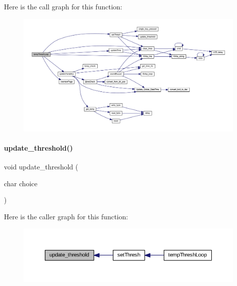 Here is the call graph for this function\+:
\nopagebreak
\begin{figure}[H]
\begin{center}
\leavevmode
\includegraphics[width=350pt]{a00053_af9c48a1dcf99ec4adcf775f6c9a15566_cgraph}
\end{center}
\end{figure}
\mbox{\label{a00053_a3acd2fb37a2da55980e0f729314ef612}} 
\paragraph{update\+\_\+threshold()}
{\footnotesize\ttfamily void update\+\_\+threshold (\begin{DoxyParamCaption}\item[{char}]{choice }\end{DoxyParamCaption})}

Here is the caller graph for this function\+:
\nopagebreak
\begin{figure}[H]
\begin{center}
\leavevmode
\includegraphics[width=350pt]{a00053_a3acd2fb37a2da55980e0f729314ef612_icgraph}
\end{center}
\end{figure}
\mbox{\label{a00053_a19562d96ecbcf8a223d3c38b39993fbf}} 

